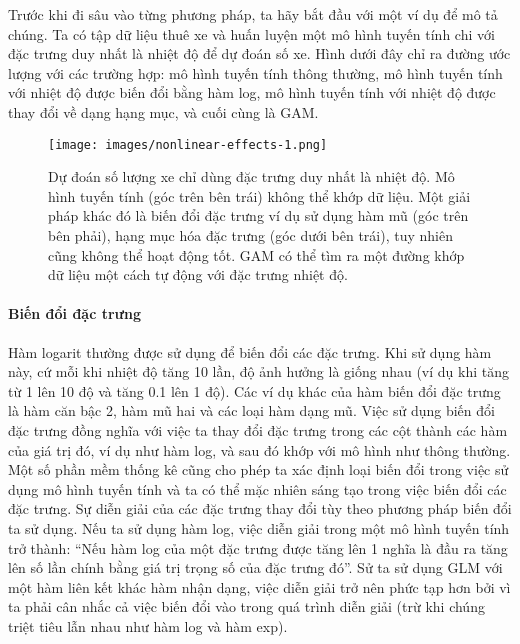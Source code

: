 Trước khi đi sâu vào từng phương pháp, ta hãy bắt đầu với một ví dụ để mô tả chúng. Ta có tập dữ liệu thuê xe và huấn luyện một mô hình tuyến tính chi với đặc trưng duy nhất là nhiệt độ để dự đoán số xe. Hình dưới đây chỉ ra đường ước lượng với các trường hợp: mô hình tuyến tính thông thường, mô hình tuyến tính với nhiệt độ được biến đổi bằng hàm log, mô hình tuyến tính với nhiệt độ được thay đổi về dạng hạng mục, và cuối cùng là GAM.

\begin{figure*}[h!]
	\centering
	\texttt{[image: images/nonlinear-effects-1.png]}
	\label{fig:4_3_13}
	\caption{Dự đoán số lượng xe chỉ dùng đặc trưng duy nhất là nhiệt độ. Mô hình tuyến tính (góc trên bên trái) không thể khớp dữ liệu. Một giải pháp khác đó là biến đổi đặc trưng ví dụ sử dụng hàm mũ (góc trên bên phải), hạng mục hóa đặc trưng (góc dưới bên trái), tuy nhiên cũng không thể hoạt động tốt. GAM có thể tìm ra một đường khớp dữ liệu một cách tự động với đặc trưng nhiệt độ.}
\end{figure*}

\paragraph{Biến đổi đặc trưng}

Hàm logarit thường được sử dụng để biến đổi các đặc trưng. Khi sử dụng hàm này, cứ mỗi khi nhiệt độ tăng 10 lần, độ ảnh hưởng là giống nhau (ví dụ khi tăng từ 1 lên 10 độ và tăng 0.1 lên 1 độ). Các ví dụ khác của hàm biến đổi đặc trưng là hàm căn bậc 2, hàm mũ hai và các loại hàm dạng mũ. Việc sử dụng biến đổi đặc trưng đồng nghĩa với việc ta thay đổi đặc trưng trong các cột thành các hàm của giá trị đó, ví dụ như hàm log, và sau đó khớp với mô hình như thông thường. Một số phần mềm thống kê cũng cho phép ta xác định loại biến đổi trong việc sử dụng mô hình tuyến tính và ta có thể mặc nhiên sáng tạo trong việc biến đổi các đặc trưng. Sự diễn giải của các đặc trưng thay đổi tùy theo phương pháp biến đổi ta sử dụng. Nếu ta sử dụng hàm log, việc diễn giải trong một mô hình tuyến tính trở thành: ``Nếu hàm log của một đặc trưng được tăng lên 1 nghĩa là đầu ra tăng lên số lần chính bằng giá trị trọng số của đặc trưng đó''. Sử ta sử dụng GLM với một hàm liên kết khác hàm nhận dạng, việc diễn giải trở nên phức tạp hơn bởi vì ta phải cân nhắc cả việc biến đổi vào trong quá trình diễn giải (trừ khi chúng triệt tiêu lẫn nhau như hàm log và hàm exp).

